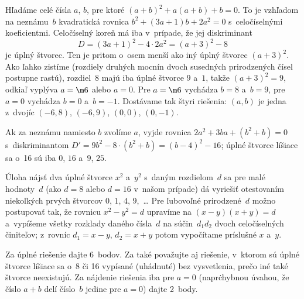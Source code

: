 {%
Hľadáme celé čísla $a$, $b$, pre ktoré $(a+b)^2+a(a+b)+b=0$. To je
vzhľadom na neznámu~$b$ kvadratická rovnica $b^2+(3a+1)b+2a^2=0$
s~celočíselnými koeficientmi. Celočíselný koreň má iba v~prípade, že
jej diskriminant
$$
D=(3a+1)^2-4\cdot2a^2=(a+3)^2-8    %
$$
je úplný štvorec. Ten je pritom o~osem menší ako iný úplný
štvorec $(a+3)^2$. Ako ľahko zistíme (rozdiely druhých mocnín
dvoch susedných prirodzených čísel postupne rastú), rozdiel~8
majú iba úplné štvorce $9$ a~$1$, takže $(a+3)^2=9$, odkiaľ
vyplýva $a=\m6$ alebo $a=0$. Pre $a=\m6$ vychádza $b=8$ a~$b=9$, pre
$a=0$ vychádza $b=0$ a~$b=-1$. Dostávame tak štyri riešenia: $(a,b)$
je jedna z~dvojíc $(-6,8)$, $(-6,9)$, $(0,0)$, $(0,-1)$.

\poznamky
Ak za neznámu namiesto $b$ zvolíme $a$, vyjde rovnica
$2a^2+3ba+(b^2+b)=0$ s~diskriminantom
$D'=9b^2-8\cdot(b^2+b)=(b-4)^2-16$; úplné štvorce líšiace sa o~16
sú iba $0$, $16$ a~$9$, $25$.              

Úloha nájsť dva úplné štvorce $x^2$ a~$y^2$
s~daným rozdielom~$d$ sa pre malé hodnoty~$d$
(ako $d=8$ alebo $d=16$ v~našom prípade) dá vyriešiť %
otestovaním niekoľkých prvých štvorcov $0$, $1$, $4$, $9$,~\dots{}
Pre ľubovoľné prirodzené~$d$ možno postupovať tak, že rovnicu
$x^2-y^2=d$ upravíme na $(x-y)(x+y)=d$ a~vypíšeme všetky
rozklady daného čísla~$d$ na súčin~$d_1d_2$ dvoch
celočíselných činiteľov; z~rovníc $d_1=x-y$, $d_2=x+y$ potom
vypočítame príslušné $x$ a~$y$.


\nobreak\medskip\petit\noindent
Za úplné riešenie dajte 6~bodov.
Za také považujte aj riešenie, v~ktorom sú úplné štvorce líšiace
sa o~8 či 16 vypísané (uhádnuté) bez vysvetlenia, prečo iné také
štvorce neexistujú.
Za nájdenie riešenia iba pre $a=0$
(napr\. chybnou úvahou, že číslo $a+b$ delí číslo~$b$ jedine pre
$a=0$) dajte 2~body.
\endpetit
\bigbreak}

